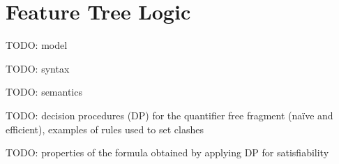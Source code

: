 
\section{Feature Tree Logic}
\label{sec:FTL}

TODO: model

TODO: syntax

TODO: semantics

TODO: decision procedures (DP) for the quantifier free fragment (naïve and efficient),
	examples of rules used to set clashes

TODO: properties of the formula obtained by applying DP for satisfiability
